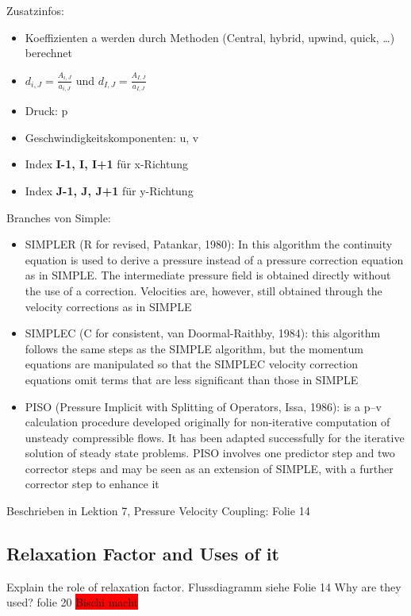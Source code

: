 \documentclass[a4paper]{scrartcl}
\begin{document}
Zusatzinfos:\\
\begin{itemize}
  \item Koeffizienten a werden durch Methoden (Central, hybrid, upwind, quick,
  \ldots) berechnet
  \item $d_{i,J} = \frac{A_{i,J}}{a_{i,J}}$ und $d_{I,J} =
  \frac{A_{I,J}}{a_{I,J}}$
  \item Druck: p
  \item Geschwindigkeitskomponenten: u, v
  \item Index \textbf{I-1, I, I+1} für x-Richtung
  \item Index \textbf{J-1, J, J+1} für y-Richtung
\end{itemize}

Branches von Simple:\\
\begin{itemize}
  \item SIMPLER (R for revised, Patankar, 1980): In this algorithm the
  continuity equation is used to derive a pressure instead of a pressure correction equation as in SIMPLE. The intermediate pressure field is obtained directly without the use of a correction. Velocities are, however, still obtained through the velocity corrections as in SIMPLE
  \item SIMPLEC (C for consistent, van Doormal-Raithby, 1984): this algorithm
  follows the same steps as the SIMPLE algorithm, but the momentum equations are manipulated so that the SIMPLEC velocity correction equations omit terms that are less significant than those in SIMPLE
  \item PISO (Pressure Implicit with Splitting of Operators, Issa, 1986): is a
  p–v calculation procedure developed originally for non-iterative computation of unsteady compressible flows. It has been adapted successfully for the iterative solution of steady state problems. PISO involves one predictor step and two corrector steps and may be seen as an extension of SIMPLE, with a further corrector step to enhance it
\end{itemize}

Beschrieben in Lektion 7, Pressure Velocity Coupling: Folie 14


\subsection{Relaxation Factor and Uses of it}
Explain the role of relaxation factor. 
Flussdiagramm siehe Folie 14
 Why are they used?
folie 20
\colorbox{red}{Bischi macht}
\end{document}
